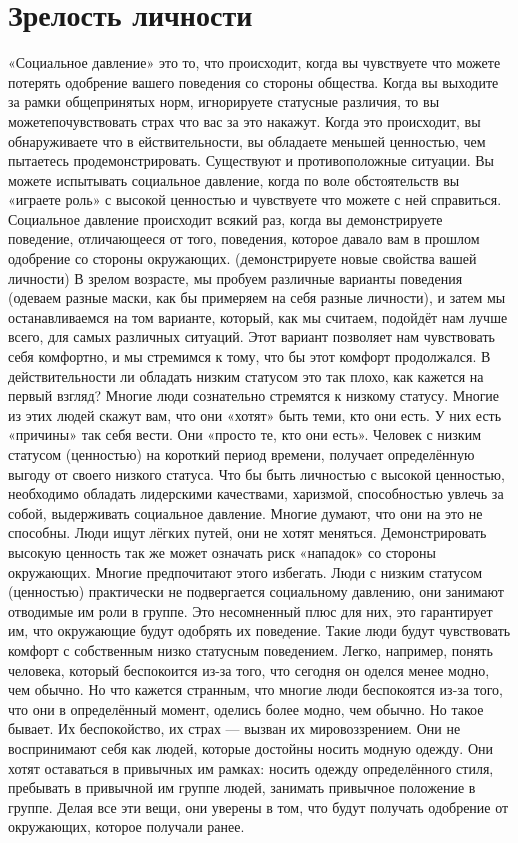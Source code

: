\chapter{Зрелость личности}

«Социальное давление» это то, что происходит, когда вы чувствуете что можете потерять одобрение вашего поведения со стороны общества. Когда вы выходите за рамки общепринятых норм, игнорируете статусные различия, то вы можетепочувствовать страх что вас за это накажут. Когда это происходит, вы обнаруживаете что в ействительности, вы обладаете меньшей ценностью, чем пытаетесь продемонстрировать. Существуют и противоположные ситуации. Вы можете испытывать социальное давление, когда по воле обстоятельств вы «играете роль» с высокой ценностью и чувствуете что можете с ней справиться. Социальное давление происходит всякий раз, когда вы демонстрируете поведение, отличающееся от того, поведения, которое давало вам в прошлом одобрение со стороны окружающих. (демонстрируете новые свойства вашей личности) В зрелом возрасте, мы пробуем различные варианты поведения (одеваем разные маски, как бы примеряем на себя разные личности), и затем мы останавливаемся на том варианте, который, как мы считаем, подойдёт нам лучше всего, для самых различных ситуаций. Этот вариант позволяет нам чувствовать себя комфортно, и мы стремимся к тому, что бы этот комфорт продолжался. В действительности ли обладать низким статусом это так плохо, как кажется на первый взгляд? Многие люди сознательно стремятся к низкому статусу. Многие из этих людей скажут вам, что они «хотят» быть теми, кто они есть. У них есть «причины» так себя вести. Они «просто те, кто они есть». Человек с низким статусом (ценностью) на короткий период времени, получает определённую выгоду от своего низкого статуса. Что бы быть личностью с высокой ценностью, необходимо обладать лидерскими качествами, харизмой, способностью увлечь за собой, выдерживать социальное давление. Многие думают, что они на это не способны. Люди ищут лёгких путей, они не хотят меняться. Демонстрировать высокую ценность так же может означать риск «нападок» со стороны окружающих. Многие предпочитают этого избегать. Люди с низким статусом (ценностью) практически не подвергается социальному давлению, они занимают отводимые им роли в группе. Это несомненный плюс для них, это гарантирует им, что окружающие будут одобрять их поведение. Такие люди будут чувствовать комфорт с собственным низко статусным поведением. Легко, например, понять человека, который беспокоится из-за того, что сегодня он оделся менее модно, чем обычно. Но что кажется странным, что многие люди беспокоятся из-за того, что они в определённый момент, оделись более модно, чем обычно. Но такое бывает. Их беспокойство, их страх --- вызван их мировоззрением. Они не воспринимают себя как людей, которые достойны носить модную одежду. Они хотят оставаться в привычных им рамках: носить одежду определённого стиля, пребывать в привычной им группе людей, занимать привычное положение в группе. Делая все эти вещи, они уверены в том, что будут получать одобрение от окружающих, которое получали ранее.

